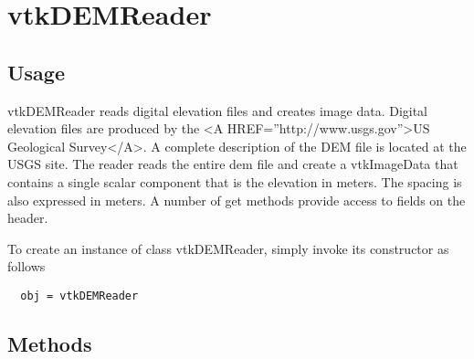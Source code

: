 \section{vtkDEMReader}

\subsection{Usage}

 vtkDEMReader reads digital elevation files and creates image data.
 Digital elevation files are produced by the
 <A HREF=''http://www.usgs.gov''>US Geological Survey</A>. 
 A complete description of the DEM file is located at the USGS site.
 The reader reads the entire dem file and create a vtkImageData that
 contains a single scalar component that is the elevation in meters.
 The spacing is also expressed in meters. A number of get methods
 provide access to fields on the header.

To create an instance of class vtkDEMReader, simply
invoke its constructor as follows
\begin{verbatim}
  obj = vtkDEMReader
\end{verbatim}
\subsection{Methods}

